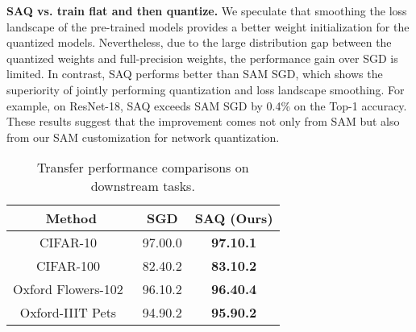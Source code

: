 \noindent\textbf{SAQ vs. train flat and then quantize.}
We speculate that smoothing the loss landscape of the pre-trained models provides a better weight initialization for the quantized models.
Nevertheless, due to the large distribution gap between the quantized weights and full-precision weights, the performance gain over SGD is limited.
In contrast, SAQ performs better than SAM  SGD, which shows the superiority of jointly performing quantization and loss landscape smoothing. For example, on ResNet-18, SAQ exceeds SAM  SGD by 0.4\% on the Top-1 accuracy.
These results suggest that the improvement comes not only from SAM but also from our SAM customization for network quantization.

\begin{table}[t]
\renewcommand{\arraystretch}{1.3}
\caption{Transfer performance comparisons on downstream tasks. 
}
\vspace{-0.1in}
\centering
\scalebox{0.72}
{
\begin{tabular}{ccc}
\toprule
Method & SGD & SAQ (Ours) \\
\midrule
CIFAR-10~\cite{krizhevsky2009learning} & 97.00.0 & \textbf{97.10.1} \\
CIFAR-100~\cite{krizhevsky2009learning} & 82.40.2 & \textbf{83.10.2} \\
Oxford Flowers-102~\cite{parkhi2012cats} & 96.10.2 & \textbf{96.40.4} \\
Oxford-IIIT Pets~\cite{nilsback2008automated} & 94.90.2 & \textbf{95.90.2} \\
\bottomrule
\end{tabular}
}
\label{table:transfer_results}
\vspace{-0.22in}
\end{table}


